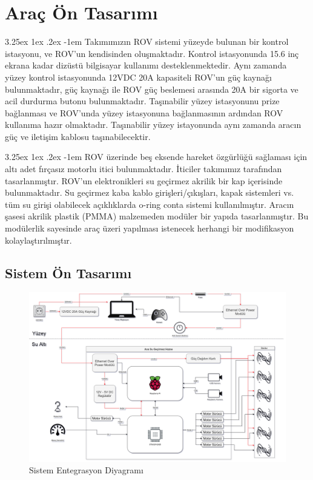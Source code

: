 \documentclass[12pt]{article}
\makeatletter
\renewcommand\paragraph{\@startsection{paragraph}{5}{\z@}%
  {3.25ex \@plus1ex \@minus.2ex}%
  {-1em}%
  {\normalfont\normalsize\bfseries}}
\makeatother
\begin{document}
\newpage

\section{Araç Ön Tasarımı}

\paragraph{} Takımımızın ROV sistemi yüzeyde bulunan bir kontrol istasyonu, ve ROV'un kendisinden oluşmaktadır. Kontrol istasyonunda 15.6 inç ekrana kadar dizüstü bilgisayar kullanımı desteklenmektedir. Aynı zamanda yüzey kontrol istasyonunda 12VDC 20A kapasiteli ROV'un güç kaynağı bulunmaktadır, güç kaynağı ile ROV güç beslemesi arasında 20A bir sigorta ve acil durdurma butonu bulunmaktadır. Taşınabilir yüzey istasyonunu prize bağlanması ve ROV'unda yüzey istasyonuna bağlanmasının ardından ROV kullanıma hazır olmaktadır. Taşınabilir yüzey istayonunda aynı zamanda aracın güç ve iletişim kablosu taşınabilecektir. 

\paragraph{} ROV üzerinde beş eksende hareket özgürlüğü sağlaması için altı adet fırçasız motorlu itici bulunmaktadır. İticiler takımımız tarafından tasarlanmıştır. ROV'un elektronikleri su geçirmez akrilik bir kap içerisinde bulunmaktadır. Su geçirmez kaba kablo girişleri/çıkışları, kapak sistemleri vs. tüm su girişi olabilecek açıklıklarda o-ring conta sistemi kullanılmıştır. Aracın şasesi akrilik plastik (PMMA) malzemeden modüler bir yapıda tasarlanmıştır. Bu modülerlik sayesinde araç üzeri yapılması istenecek herhangi bir modifikasyon kolaylaştırılmıştır. 

\newpage
\subsection{Sistem Ön Tasarımı}

\begin{figure}[h]
\centering
\includegraphics[width=1\textwidth]{SID.png}
\caption{Sistem Entegrasyon Diyagramı}
\label{fig:SID}
\end{figure}
\end{document}

